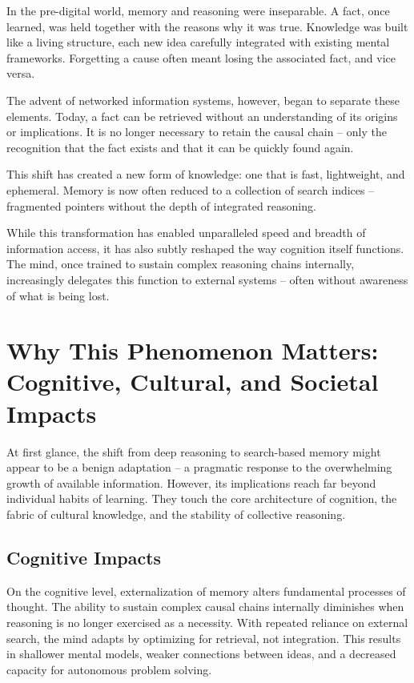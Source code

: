 In the pre-digital world, memory and reasoning were inseparable. A fact,
once learned, was held together with the reasons why it was true.
Knowledge was built like a living structure, each new idea carefully
integrated with existing mental frameworks. Forgetting a cause often
meant losing the associated fact, and vice versa.

The advent of networked information systems, however, began to separate
these elements. Today, a fact can be retrieved without an understanding
of its origins or implications. It is no longer necessary to retain the
causal chain -- only the recognition that the fact exists and that it can
be quickly found again.

This shift has created a new form of knowledge: one that is fast,
lightweight, and ephemeral. Memory is now often reduced to a collection
of search indices -- fragmented pointers without the depth of integrated
reasoning.

While this transformation has enabled unparalleled speed and breadth of
information access, it has also subtly reshaped the way cognition itself
functions. The mind, once trained to sustain complex reasoning chains
internally, increasingly delegates this function to external systems --
often without awareness of what is being lost.

\section{Why This Phenomenon Matters: Cognitive, Cultural, and Societal
  Impacts}

At first glance, the shift from deep reasoning to search-based memory
might appear to be a benign adaptation -- a pragmatic response to the
overwhelming growth of available information. However, its implications
reach far beyond individual habits of learning. They touch the core
architecture of cognition, the fabric of cultural knowledge, and the
stability of collective reasoning.

\subsection{Cognitive Impacts}

On the cognitive level, externalization of memory alters fundamental
processes of thought. The ability to sustain complex causal chains
internally diminishes when reasoning is no longer exercised as a
necessity. With repeated reliance on external search, the mind adapts by
optimizing for retrieval, not integration. This results in shallower
mental models, weaker connections between ideas, and a decreased
capacity for autonomous problem solving.

